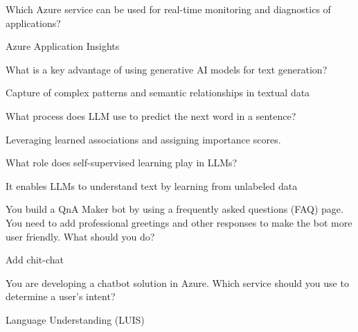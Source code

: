 \begin{qanda}
	\begin{question}
Which Azure service can be used for real-time monitoring and diagnostics of applications?
	\end{question}
	\begin{answer}
Azure Application Insights
	\end{answer}
\end{qanda}

\begin{qanda}
	\begin{question}
What is a key advantage of using generative AI models for text generation?
	\end{question}
	\begin{answer}
Capture of complex patterns and semantic relationships in textual data
	\end{answer}
\end{qanda}

\begin{qanda}
	\begin{question}
What process does LLM use to predict the next word in a sentence?
	\end{question}
	\begin{answer}
Leveraging learned associations and assigning importance scores.
	\end{answer}
\end{qanda}

\begin{qanda}
	\begin{question}
What role does self-supervised learning play in LLMs?
	\end{question}
	\begin{answer}
It enables LLMs to understand text by learning from unlabeled data
	\end{answer}
\end{qanda}

\begin{qanda}
	\begin{question}
You build a QnA Maker bot by using a frequently asked questions (FAQ) page.  You need to add professional greetings and other responses to make the bot more user friendly.  What should you do?
	\end{question}
	\begin{answer}
Add chit-chat
	\end{answer}
\end{qanda}

\begin{qanda}
	\begin{question}
You are developing a chatbot solution in Azure. Which service should you use to determine a user's intent?
	\end{question}
	\begin{answer}
Language Understanding (LUIS)
	\end{answer}
\end{qanda}

